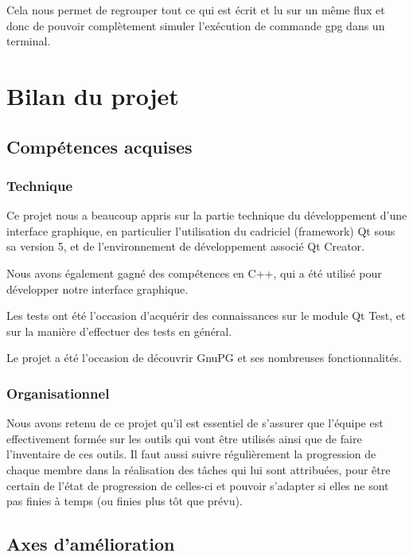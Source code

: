 \documentclass{../res/univ-projet}
\begin{document}
      Cela nous permet de regrouper tout ce qui est écrit et lu sur un même flux et donc de pouvoir
      complètement simuler l'exécution de commande gpg dans un terminal.
  

\section{Bilan du projet}
  
  \subsection{Compétences acquises}

    \subsubsection{Technique}
    
      Ce projet nous a beaucoup appris sur la partie technique du développement d'une interface graphique, en particulier l'utilisation du cadriciel (framework) Qt sous sa version 5, et de l'environnement de développement associé Qt Creator.

      Nous avons également gagné des compétences en C++, qui a été utilisé pour développer notre interface graphique.

      Les tests ont été l'occasion d'acquérir des connaissances sur le module Qt Test, et sur la manière d'effectuer des tests en général.

      Le projet a été l'occasion de découvrir GnuPG et ses nombreuses fonctionnalités.

    \subsubsection{Organisationnel}

      Nous avons retenu de ce projet qu'il est essentiel de s'assurer que l'équipe est effectivement formée sur les outils qui vont être utilisés ainsi que de faire l'inventaire de ces outils.
      Il faut aussi suivre régulièrement la progression de chaque membre dans la réalisation des tâches qui lui sont attribuées, pour être certain de l'état de progression de celles-ci et pouvoir s'adapter si elles ne sont pas finies à temps (ou finies plus tôt que prévu).




  \subsection{Axes d'amélioration}
  
\end{document}
